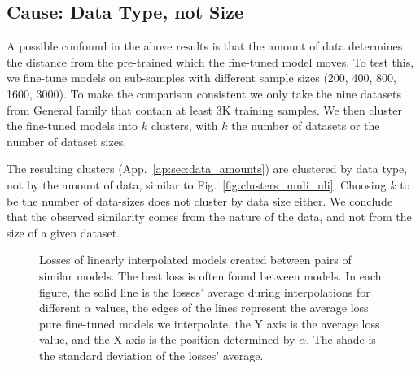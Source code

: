\documentclass[nohyperref]{article}
\theoremstyle{plain}
\theoremstyle{definition}
\theoremstyle{remark}
\begin{document}
\subsection{Cause: Data Type, not Size}\label{sec:data_amounts}
A possible confound in the above results is that the amount of data determines the distance from the pre-trained which the fine-tuned model moves.
To test this, we fine-tune models on sub-samples with different sample sizes (200, 400, 800, 1600, 3000).
To make the comparison consistent we only take the nine datasets from General family that contain at least 3K training samples.
We then cluster the fine-tuned models into $k$ clusters, with $k$ the number of datasets or the number of dataset sizes.

The resulting clusters (App.~\ref{ap:sec:data_amounts}) are clustered by data type, not by the amount of data, similar to Fig.~\ref{fig:clusters_mnli_nli}. Choosing $k$ to be the number of data-sizes does not cluster by data size either. 
We conclude that the observed similarity comes from the nature of the data, and not from the size of a given dataset. 


\begin{figure*}[t]
\hfill
{}
\hfill
{}
\caption{Losses of linearly interpolated models created between pairs of similar models. The best loss is often found between models. In each figure, the solid line is the losses' average during interpolations for different $ \alpha $ values, the edges of the lines represent the average loss pure fine-tuned models we interpolate, the Y axis is the average loss value, and the X axis is the position determined by $\alpha$. The shade is the standard deviation of the losses' average. 
\label{fig:interpolation_all_granular_levels}}
\end{figure*}
\end{document}
